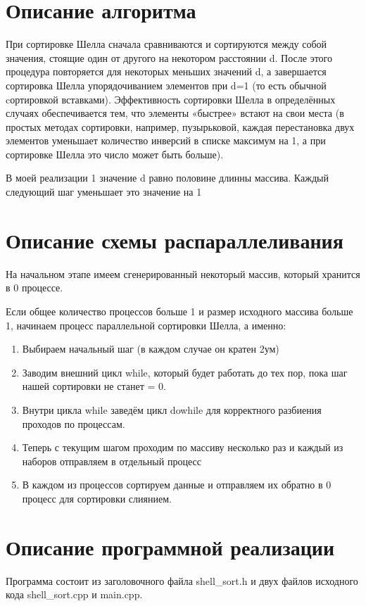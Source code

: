 \documentclass{report}
\begin{document}
\section*{Описание алгоритма}
\par При сортировке Шелла сначала сравниваются и сортируются между собой значения, стоящие один от другого на некотором расстоянии d. После этого процедура повторяется для некоторых меньших значений d, а завершается сортировка Шелла упорядочиванием элементов при d=1 (то есть обычной cортировкой вставками). Эффективность сортировки Шелла в определённых случаях обеспечивается тем, что элементы «быстрее» встают на свои места (в простых методах сортировки, например, пузырьковой, каждая перестановка двух элементов уменьшает количество инверсий в списке максимум на 1, а при сортировке Шелла это число может быть больше). 
\par В моей реализации 1 значение d равно половине длинны массива. Каждый следующий шаг уменьшает это значение на 1
\newpage
\section*{Описание схемы распараллеливания}
На начальном этапе имеем сгенерированный некоторый массив, который хранится в 0 процессе.

Если общее количество процессов больше 1 и размер исходного массива больше 1, начинаем процесс параллельной сортировки Шелла, а именно:
\begin{enumerate} 
\item Выбираем начальный шаг (в каждом случае он кратен 2ум)
\item Заводим внешний цикл while, который будет работать до тех пор, пока шаг нашей сортировки не станет = 0.
\item Внутри цикла while заведём цикл do{}while для корректного разбиения проходов по процессам.
\item Теперь с текущим шагом проходим по массиву несколько раз и каждый из наборов отправляем в отдельный процесс
\item В каждом из процессов сортируем данные и отправляем их обратно в 0 процесс для сортировки слиянием.

\end{enumerate}
\newpage
\section*{Описание программной реализации}
Программа состоит из заголовочного файла shell\_sort.h и двух файлов исходного кода shell\_sort.cpp и main.cpp.
\end{document}
